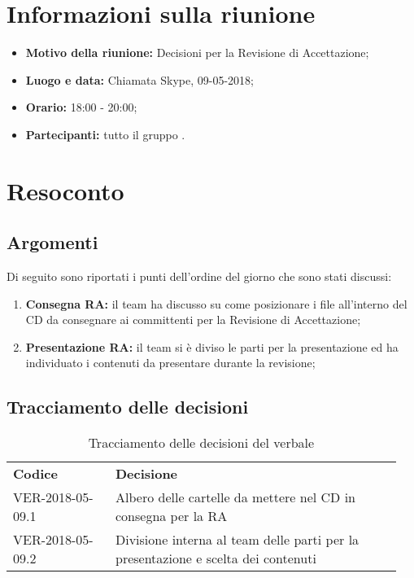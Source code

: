 \documentclass[VER-2018-05-09.tex]{subfiles}
\begin{document}
	


\chapter{Informazioni sulla riunione}
\begin{itemize}
	\item \textbf{Motivo della riunione:} Decisioni per la Revisione di Accettazione;
	\item \textbf{Luogo e data:} Chiamata Skype, 09-05-2018;
	\item \textbf{Orario:} 18:00 - 20:00;
	\item \textbf{Partecipanti:} tutto il gruppo \gruppo.
\end{itemize}



\chapter{Resoconto}
\section{Argomenti}
Di seguito sono riportati i punti dell'ordine del giorno che sono stati discussi:
\begin{enumerate}
	\item \textbf{Consegna RA:} il team ha discusso su come posizionare i file all'interno del CD da consegnare ai committenti per la Revisione di Accettazione;
	\item \textbf{Presentazione RA:} il team si è diviso le parti per la presentazione ed ha individuato i contenuti da presentare durante la revisione;
\end{enumerate}
\section{Tracciamento delle decisioni}
\begin{table}[H]
	\begin{center}
		\begin{tabu} to 
			\tableHeaderStyle
			\textbf{Codice} & \textbf{Decisione} \\
			VER-2018-05-09.1 & Albero delle cartelle da mettere nel CD in consegna per la RA \\
			VER-2018-05-09.2 & Divisione interna al team delle parti per la presentazione e scelta dei contenuti \\
		\end{tabu}
		\caption{Tracciamento delle decisioni del verbale}
	\end{center}
\end{table}
\end{document}
